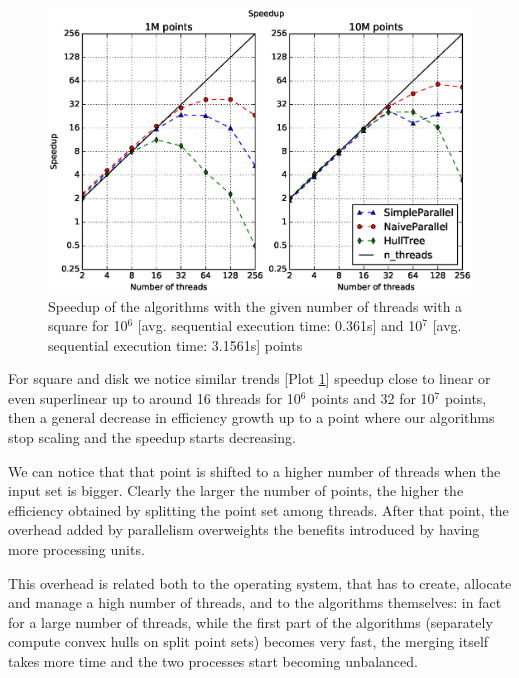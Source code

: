 \documentclass[letterpaper]{article}
\theoremstyle{definition}
\begin{document}
\begin{figure}[!ht]\centering
  \includegraphics[scale=0.33]{./plots/speedup_xeon_square_fixed_points.eps}
  \caption{Speedup of the algorithms with the given number of threads with a square for 10$^6$ [avg. sequential execution time: 0.361s] and 10$^7$ [avg. sequential execution time: 3.1561s] points\label{Threads speedup square}}
\end{figure}

For square and disk we notice similar trends [Plot \ref{Threads speedup square}] speedup close to linear or even superlinear up to around 16 threads for 10$^6$ points and 32 for 10$^7$ points, then a general decrease in efficiency growth up to a point where our algorithms stop scaling and the speedup starts decreasing.

We can notice that that point is shifted to a higher number of threads when the input set is bigger.
Clearly the larger the number of points, the higher the efficiency obtained by splitting the point set among threads.
After that point, the overhead added by parallelism overweights the benefits introduced by having more processing units.

This overhead is related both to the operating system, that has to create, allocate and manage a high number of threads, and to the algorithms themselves:
in fact for a large number of threads, while the first part of the algorithms (separately compute convex hulls on split point sets) becomes very fast, the merging itself takes more time and the two processes start becoming unbalanced.
\end{document}
